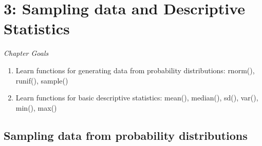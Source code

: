 \documentclass{tufte-book}\usepackage[]{graphicx}\usepackage[]{color}
\begin{document}

\chapter{3: Sampling data and Descriptive Statistics}
\label{ch:3}

\textit{Chapter Goals}

\begin{enumerate}
  \item Learn functions for generating data from probability distributions: rnorm(), runif(), sample()
  \item Learn functions for basic descriptive statistics: mean(), median(), sd(), var(), min(), max()
\end{enumerate}


\section{Sampling data from probability distributions}
\end{document}
